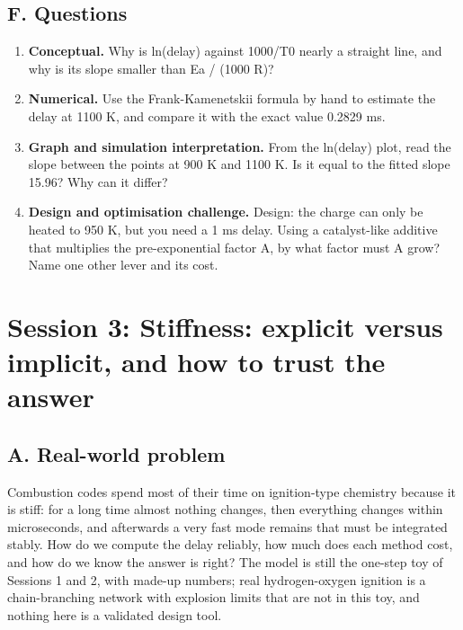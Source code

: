 \documentclass[11pt,a4paper]{article}
\begin{document}
\subsection*{F. Questions}
\begin{enumerate}[nosep]
\item \textbf{Conceptual.} Why is ln(delay) against 1000/T0 nearly a straight line, and why is its slope smaller than Ea / (1000 R)?
\item \textbf{Numerical.} Use the Frank-Kamenetskii formula by hand to estimate the delay at 1100 K, and compare it with the exact value 0.2829 ms.
\item \textbf{Graph and simulation interpretation.} From the ln(delay) plot, read the slope between the points at 900 K and 1100 K. Is it equal to the fitted slope 15.96? Why can it differ?
\item \textbf{Design and optimisation challenge.} Design: the charge can only be heated to 950 K, but you need a 1 ms delay. Using a catalyst-like additive that multiplies the pre-exponential factor A, by what factor must A grow? Name one other lever and its cost.
\end{enumerate}

\section{Session 3: Stiffness: explicit versus implicit, and how to trust the answer}

\subsection*{A. Real-world problem}
Combustion codes spend most of their time on ignition-type chemistry because it is stiff: for a long time almost nothing changes, then everything changes within microseconds, and afterwards a very fast mode remains that must be integrated stably. How do we compute the delay reliably, how much does each method cost, and how do we know the answer is right? The model is still the one-step toy of Sessions 1 and 2, with made-up numbers; real hydrogen-oxygen ignition is a chain-branching network with explosion limits that are not in this toy, and nothing here is a validated design tool.
\end{document}
